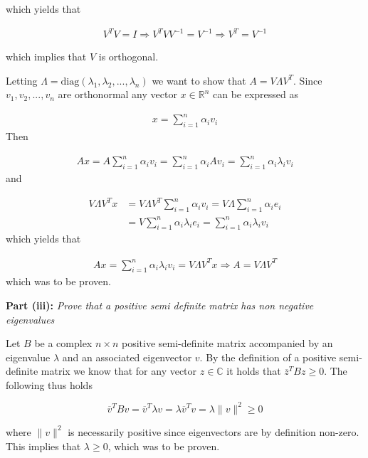 which yields that

\begin{align*}
  V^TV = I \Rightarrow V^T V V^{-1} = V^{-1} \Rightarrow V^T = V^{-1}
\end{align*}

which implies that $V$ is orthogonal.

Letting $\Lambda = \text{diag}(\lambda_1, \lambda_2,..., \lambda_n)$ we want to show that $A = V \Lambda V^T$. Since $v_1, v_2, ..., v_{n}$ are orthonormal any vector $x \in \mathbb{R}^n$ can be expressed as

\begin{align*}
  x = \sum_{i=1}^n \alpha_i v_i
\end{align*}
Then

\begin{align*}
  Ax = A  \sum_{i=1}^n \alpha_i v_i =  \sum_{i=1}^n \alpha_i Av_i =  \sum_{i=1}^n \alpha_i \lambda_i v_i
\end{align*}
and

\begin{align*}
  V \Lambda V^T x & = V \Lambda V^T \sum_{i=1}^n \alpha_i v_i = V \Lambda \sum_{i=1}^n \alpha_i e_i \\
  & = V \sum_{i=1}^n \alpha_i \lambda_i e_i = \sum_{i=1}^n \alpha_i \lambda_i v_i
\end{align*}
which yields that

\begin{align}
  Ax = \sum_{i=1}^n \alpha_i \lambda_i v_i = V \Lambda V^T x \Rightarrow A = V \Lambda V^T
\end{align}
which was to be proven. 

\textbf{Part (iii):} \textit{Prove that a positive semi definite matrix has non negative eigenvalues}

Let $B$ be a complex $n \times n$ positive semi-definite matrix accompanied by an eigenvalue $\lambda$ and an associated eigenvector $v$. By the definition of a positive semi-definite matrix we know that for any vector $z \in \mathbb{C}$ it holds that $\overline{z}^T B z \geq 0$. The following thus holds

\begin{equation}
  \overline{v}^T B v = \overline{v}^T \lambda v = \lambda \overline{v}^T v = \lambda \lVert v \rVert^2 \geq 0
  \label{iii_1}
\end{equation}

where $\lVert v \rVert^2$ is necessarily positive since eigenvectors are by definition non-zero. This implies that $\lambda \geq 0$, which was to be proven.
\\


